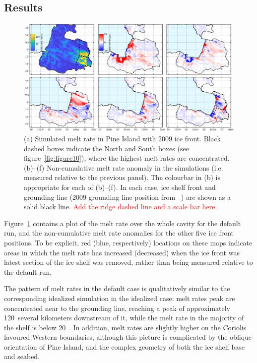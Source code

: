 \documentclass[draft]{agujournal2019}
\newcommand{\red}[1]{\textcolor{red}{#1}}
\begin{document}
\subsection{Results}

\begin{figure}
    \centering
    \includegraphics[width = \textwidth]{../make_figures/plots/figure11.eps}
    \caption{(a) Simulated melt rate in Pine Island with 2009 ice front. Black dashed boxes indicate the North and South boxes (see figure~\ref{fig:figure10}), where the highest melt rates are concentrated. (b)--(f) Non-cumulative melt rate anomaly in the simulations (i.e. measured relative to the previous panel). The colourbar in (b) is appropriate for each of (b)--(f). In each case, ice shelf front and grounding line (2009 grounding line position from ~\cite{Joughin2010GRL}) are shown as a solid black line. \red{Add the ridge dashed line and a scale bar here.}} 
    \label{fig:figure11}
\end{figure}


Figure~\ref{fig:figure11} contains a plot of the melt rate over the whole cavity for the default run, and the non-cumulative melt rate anomalies for the other five ice front positions. To be explicit, red (blue, respectively) locations on these maps indicate areas in which the melt rate has increased (decreased) when the ice front was latest section of the ice shelf was removed, rather than being measured relative to the default run. 

The pattern of melt rates in the default case is qualitatively similar to the corresponding idealized simulation in the idealized case: melt rates peak are concentrated near to the grounding line, reaching a peak of approximately 120~\mpryr several kilometers downstream of it, while the melt rate in the majority of the shelf is below 20~\mpryr. In addition, melt rates are slightly higher on the Coriolis favoured Western boundaries, although this picture is complicated by the oblique orientation of Pine Island, and the complex geometry of both the ice shelf base and seabed.
\end{document}
